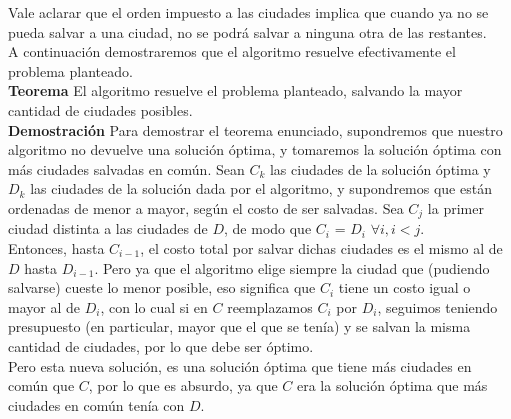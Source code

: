 Vale aclarar que el orden impuesto a las ciudades implica que cuando ya no se pueda salvar a una ciudad, no se podr\'a salvar a ninguna otra de las restantes.\\
 

A continuación demostraremos que el algoritmo resuelve efectivamente el problema planteado.\\

\textbf{Teorema}
El algoritmo resuelve el problema planteado, salvando la mayor cantidad de ciudades posibles.\\

\textbf{Demostraci\'on}
Para demostrar el teorema enunciado, supondremos que nuestro algoritmo no devuelve una solución óptima, y tomaremos la solución óptima con más ciudades salvadas en común.
Sean $C_{k}$ las ciudades de la solución óptima y $D_{k}$ las ciudades de la solución dada por el algoritmo, y supondremos que están ordenadas de menor a mayor, según el costo de ser salvadas.
Sea $C_{j}$ la primer ciudad distinta a las ciudades de $D$, de modo que $C_{i}$ = $D_{i}$ $\forall i, i < j$.\\

Entonces, hasta $C_{i-1}$, el costo total por salvar dichas ciudades es el mismo al de $D$ hasta $D_{i-1}$. Pero ya que el algoritmo elige siempre la ciudad que (pudiendo salvarse) cueste lo menor posible, eso significa que $C_{i}$ tiene un costo igual o mayor al de $D_{i}$, con lo cual si en $C$ reemplazamos $C_{i}$ por $D_{i}$, seguimos teniendo presupuesto (en particular, mayor que el que se tenía) y se salvan la misma cantidad de ciudades, por lo que debe ser óptimo.\\

Pero esta nueva solución, es una solución óptima que tiene más ciudades en común que $C$, por lo que es absurdo, ya que $C$ era la solución óptima que más ciudades en común tenía con $D$.\\

